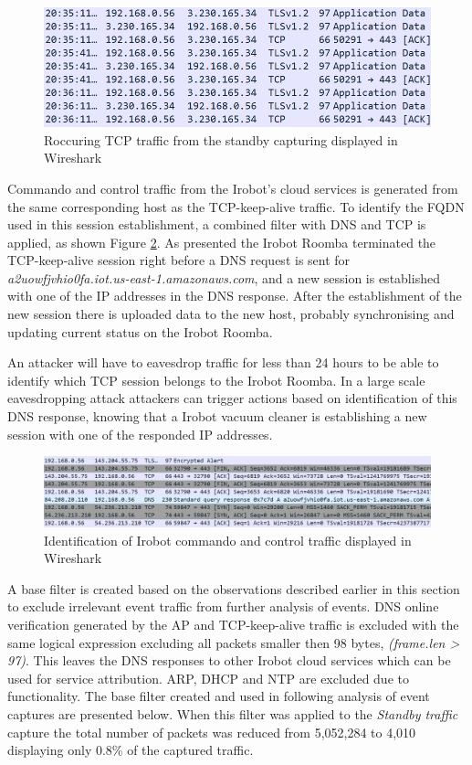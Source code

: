 \begin{figure}[H]
    \centering
    \includegraphics[width=\textwidth]{figures/tcp_keep-alive.png}
    \caption{Roccuring TCP traffic from the standby capturing displayed in Wireshark}
    \label{fig:tcp_keep-alive}
\end{figure}

Commando and control traffic from the Irobot's cloud services is generated from the same corresponding host as the TCP-keep-alive traffic. To identify the FQDN used in this session establishment, a combined filter with DNS and TCP is applied, as shown Figure \ref{fig:tcp_keep-change_dns}. As presented the Irobot Roomba terminated the TCP-keep-alive session right before a DNS request is sent for \textit{a2uowfjvhio0fa.iot.us-east-1.amazonaws.com}, and a new session is established with one of the IP addresses in the DNS response. After the establishment of the new session there is uploaded data to the new host, probably synchronising and updating current status on the Irobot Roomba.

An attacker will have to eavesdrop traffic for less than 24 hours to be able to identify which TCP session belongs to the Irobot Roomba. In a large scale eavesdropping attack attackers can trigger actions based on identification of this DNS response, knowing that a Irobot vacuum cleaner is establishing a new session with one of the responded IP addresses. 


\begin{figure}[H]
    \centering
    \includegraphics[width=\textwidth]{figures/wireshark_irobot_cloud_dns.png}
    \caption{Identification of Irobot commando and control traffic displayed in Wireshark}
    \label{fig:tcp_keep-change_dns}
\end{figure}

A base filter is created based on the observations described earlier in this section to exclude irrelevant event traffic from further analysis of events. DNS online verification generated by the AP and TCP-keep-alive traffic is excluded with the same logical expression excluding all packets smaller then 98 bytes, \textit{(frame.len > 97)}. This leaves the DNS responses to other Irobot cloud services which can be used for service attribution. ARP, DHCP and NTP are excluded due to functionality. The base filter created and used in following analysis of event captures are presented below. When this filter was applied to the \textit{Standby traffic} capture the total number of packets was reduced from 5,052,284 to 4,010 displaying only 0.8\% of the captured traffic.

